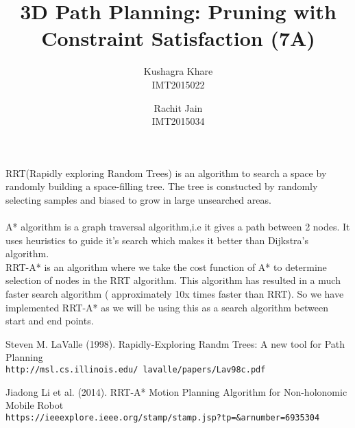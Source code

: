 \documentclass[a4paper,10pt]{article}
\title{3D Path Planning: Pruning with Constraint Satisfaction  (7A)}
\author{Kushagra Khare\\
IMT2015022
\and Rachit Jain\\
IMT2015034
}
\begin{document}
\maketitle

RRT(Rapidly exploring Random Trees) is an algorithm to search a space by randomly building a space-filling tree. The tree is constucted by randomly selecting samples and biased to grow in large unsearched areas.\\
\\A* algorithm is a graph traversal algorithm,i.e it gives a path between 2 nodes. It uses heuristics to guide it's search which makes it better than Dijkstra's algorithm.\\

RRT-A* is an algorithm where we take the cost function of A* to determine selection of nodes in the RRT algorithm. This algorithm has resulted in a much faster search algorithm ( approximately 10x times faster than RRT). So we have implemented RRT-A* as we will be using this as a search algorithm between start and end points.
\medskip

\begin{thebibliography}{9}
Steven M. LaValle (1998). Rapidly-Exploring Randm Trees: A new tool for Path Planning
\\\texttt{http://msl.cs.illinois.edu/~lavalle/papers/Lav98c.pdf}

Jiadong Li et al. (2014). RRT-A* Motion Planning Algorithm for Non-holonomic Mobile Robot  
\\\texttt{https://ieeexplore.ieee.org/stamp/stamp.jsp?tp=&arnumber=6935304}

\end{thebibliography}
\end{document}
